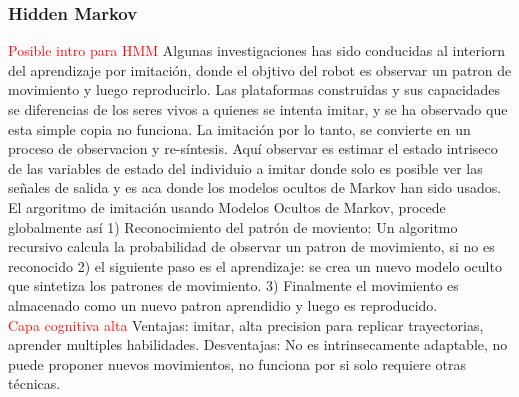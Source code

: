 \documentclass[10pt,onecolumn,twoside,letterpaper]{article}
\begin{document}
\subsubsection{Hidden Markov}
\textcolor{red}{Posible intro para HMM} Algunas investigaciones has sido conducidas al interiorn del aprendizaje por imitaci\'on, donde el objtivo del robot es observar un patron de movimiento y luego reproducirlo. Las plataformas construidas y sus capacidades se diferencias de los seres vivos a quienes se intenta imitar, y se ha observado que esta simple copia no funciona. La imitaci\'on por lo tanto, se convierte en un proceso de observacion y re-s\'intesis. Aqu\'i observar es estimar el estado intriseco de las variables de estado del individuio a imitar donde solo es posible ver las se\~nales de salida y es aca donde los modelos ocultos de Markov han sido usados.\cite{Wright2014}\\
El argoritmo de imitaci\'on usando Modelos Ocultos de Markov, procede globalmente as\'i 1) Reconocimiento del patr\'on de moviento: Un algoritmo recursivo calcula la probabilidad de observar un patron de movimiento, si no es reconocido 2) el siguiente paso es el aprendizaje:  se crea un nuevo modelo oculto que sintetiza los patrones de movimiento. 3) Finalmente el movimiento es almacenado como un nuevo patron aprendidio y luego es reproducido.\cite{Wright2014}\\
\textcolor{red}{Capa cognitiva alta} Ventajas: imitar, alta precision para replicar trayectorias, aprender multiples habilidades. Desventajas: No es intrinsecamente adaptable, no puede proponer nuevos movimientos, no funciona por si solo requiere otras t\'ecnicas.
\end{document}
